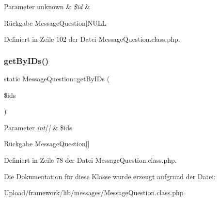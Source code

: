 \begin{DoxyParams}[1]{Parameter}
unknown & {\em \$id} & \\
\hline
\end{DoxyParams}
\begin{DoxyReturn}{Rückgabe}
Message\+Question$\vert$\+N\+U\+LL 
\end{DoxyReturn}


Definiert in Zeile 102 der Datei Message\+Question.\+class.\+php.

\mbox{\label{class_message_question_a1b58be7defeb60720a37e8c53bdbd33a}} 
\subsubsection{\texorpdfstring{get\+By\+I\+Ds()}{getByIDs()}}
{\footnotesize\ttfamily static Message\+Question\+::get\+By\+I\+Ds (\begin{DoxyParamCaption}\item[{}]{\$ids }\end{DoxyParamCaption})\hspace{0.3cm}{\ttfamily [static]}}


\begin{DoxyParams}{Parameter}
{\em int\mbox{[}$\,$\mbox{]}} & \$ids \\
\hline
\end{DoxyParams}
\begin{DoxyReturn}{Rückgabe}
\mbox{\hyperlink{class_message_question}{Message\+Question}}\mbox{[}\mbox{]} 
\end{DoxyReturn}


Definiert in Zeile 78 der Datei Message\+Question.\+class.\+php.



Die Dokumentation für diese Klasse wurde erzeugt aufgrund der Datei\+:\begin{DoxyCompactItemize}
\item 
Upload/framework/lib/messages/Message\+Question.\+class.\+php\end{DoxyCompactItemize}
